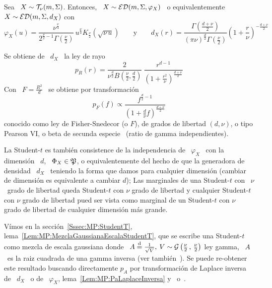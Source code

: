\begin{ejemplo}
%
  Sea \ $X \sim \mathcal{T}_\nu(m,\Sigma)$.  Entonces, \ $X \sim \mathcal{ED}(m,\Sigma,\varphi_X)$
  \ o equivalentemente \ $X \sim \mathcal{ED}(m,\Sigma,d_X)$ con
  \[
  \varphi_X(u)   =  \frac{\nu^{\frac{\nu}{4}}}{2^{\frac{\nu}{2}-1}  \Gamma\left(
      \frac{\nu}{2}   \right)}   \,  u^{\frac{\nu}{4}}   K_{\frac{\nu}{2}}\left(
    \sqrt{\nu \,  u} \right) \qquad \mbox{y} \qquad  d_X(r) = \frac{\Gamma\left(
      \frac{d+\nu}{2}     \right)}{(\pi     \nu)^{\frac{d}{2}}     \Gamma\left(
      \frac{\nu}{2}    \right)}   \left(    1    +   \frac{r}{\nu}    \right)^{-
    \frac{d+\nu}{2}}
  \]

  Se obtiene de \ $d_X$ \ la ley de rayo
  \[
  p_R(r)  =  \frac{2}{\nu^{\frac{d}{2}}   B\left(  \frac{\nu}{2}  ,  \frac{d}{2}
    \right)} \:
  \frac{r^{d-1}}{\left( 1 + \frac{r^2}{\nu} \right)^{\frac{d+\nu}{2}}}
  \]
  Con \ $F = \frac{R^2}{d}$ \ se obtiene por transformaci\'on
  \[
  p_F(f)   \propto   \frac{f^{\frac{d}{2}-1}}{\left(   1   +   \frac{d}{\nu}   f
    \right)^{\frac{d+\nu}{2}}}
  \]
  conocido como ley de Fisher-Snedecor (o $F$), de grados de libertad $(d,\nu)$,
  o tipo Pearson VI, o  beta de secunda especie~\cite{JohKot95:v2, Muk00, Bre88,
    IbaPer12} (ratio de gamma independientes).

  La Student-$t$ es tambi\'en consistence de la independencia de \ $\varphi_X$ \
  con la dimensi\'on \ $d$, \  $\Phi_X \in \mathfrak{P}$, o equivalentemente del hecho de
  que  la generadora de  densidad \  $d_X$ \  teniendo la  forma que  damos para
  cualquier dimensi\'on  (cambiar de dimensi\'on es equivalente  a cambiar $d$);
  Las  marginales de  una Student-$t$  con  \ $\nu$  \ grado  de libertad  queda
  Student-$t$  con $\nu$  grado de  libertad y  cualquier Student-$t$  con $\nu$
  grado de  libertad pued ser  vista como marginal  de un Student-$t$  con $\nu$
  grado de libertad de cualquier dimensi\'on m\'as grande.

  V\'imos           en           la           secci\'on~\ref{Sssec:MP:StudentT},
  lema~\ref{Lem:MP:MezclaGaussianaEscalaStudentT},    que    se   escribe    una
  Student-$t$   como   mezcla   de   escala   gaussiana  donde   \   $A   \stackrel{\mathrm{d}}{=}
  \frac{1}{\sqrt{V}},  \: V \sim  \mathcal{G}\left( \frac{\nu}{2}  \, ,  \, \frac{\nu}{2}
  \right)$ ley gamma, \ie \ $A$ \  es la raiz cuadrada de una gamma inversa (ver
  tambi\'en~\cite{FanKot90,  KotNad04}).   Se  puede re-obtener  este  resultado
  buscando directamente $p_A$ por transformaci\'on de Laplace inversa de \ $d_X$
  \  o  de  \  $\varphi_X$,  lema~\ref{Lem:MP:PaLaplaceInversa}  y~\cite[Cap.~5,
  Tab.~A.5.1, Ec.~14]{Pou10} o~\cite[Cap.~2, Tab.~2.3, Ec.~14]{Pou99}.
%
\end{ejemplo}


